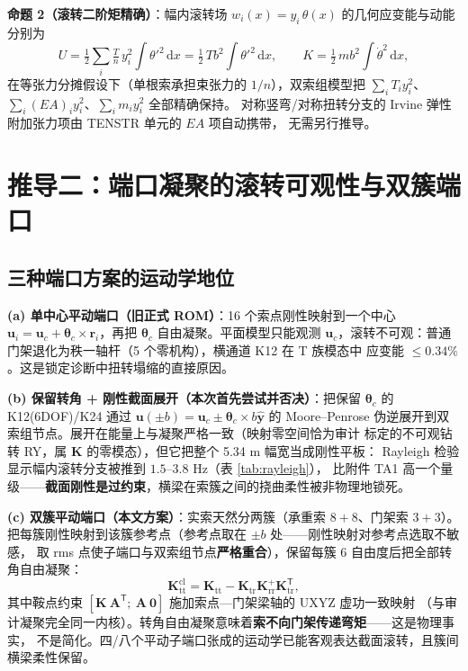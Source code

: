 \documentclass[11pt,a4paper]{ctexart}
\begin{document}
\textbf{命题 2（滚转二阶矩精确）}：幅内滚转场 $w_i(x)=y_i\,\theta(x)$ 的几何应变能与动能分别为
\begin{equation}
U=\tfrac12\textstyle\sum_i \tfrac{T}{n}\,y_i^2\!\int\!\theta'^2\,\mathrm dx
 =\tfrac12\,T b^2\!\int\!\theta'^2\,\mathrm dx,
\qquad
K=\tfrac12\, m b^2\!\int\!\dot\theta^2\,\mathrm dx ,
\end{equation}
在等张力分摊假设下（单根索承担束张力的 $1/n$），双索组模型把
$\sum_i T_i y_i^2$、$\sum_i (EA)_i y_i^2$、$\sum_i m_i y_i^2$ 全部精确保持。
对称竖弯/对称扭转分支的 Irvine 弹性附加张力项由 TENSTR 单元的 $EA$ 项自动携带，
无需另行推导。

\section{推导二：端口凝聚的滚转可观性与双簇端口}\label{sec:cluster}

\subsection{三种端口方案的运动学地位}

\textbf{(a) 单中心平动端口（旧正式 ROM）}：16 个索点刚性映射到一个中心
$\bm u_i=\bm u_c+\bm\theta_c\times\bm r_i$，再把 $\bm\theta_c$ 自由凝聚。平面模型只能观测
$\bm u_c$，滚转不可观：普通门架退化为秩一轴杆（5 个零机构），横通道 K12 在 T 族模态中
应变能 $\le0.34\%$。这是锁定诊断中扭转塌缩的直接原因。

\textbf{(b) 保留转角 + 刚性截面展开（本次首先尝试并否决）}：把保留 $\bm\theta_c$ 的
K12(6DOF)/K24 通过 $\bm u(\pm b)=\bm u_c\pm\bm\theta_c\times b\hat{\bm y}$ 的
Moore--Penrose 伪逆展开到双索组节点。展开在能量上与凝聚严格一致（映射零空间恰为审计
标定的不可观钻转 RY，属 $\bm K$ 的零模态），但它把整个 5.34 m 幅宽当成刚性平板：
Rayleigh 检验显示幅内滚转分支被推到 $1.5\text{--}3.8$ Hz（表 \ref{tab:rayleigh}），
比附件 TA1 高一个量级——\textbf{截面刚性是过约束}，横梁在索簇之间的挠曲柔性被非物理地锁死。

\textbf{(c) 双簇平动端口（本文方案）}：实索天然分两簇（承重索 $8+8$、门架索 $3+3$）。
把每簇刚性映射到该簇参考点（参考点取在 $\pm b$ 处——刚性映射对参考点选取不敏感，
取 rms 点使子端口与双索组节点\textbf{严格重合}），保留每簇 6 自由度后把全部转角自由凝聚：
\begin{equation}
\bm K_{\text{tt}}^{\text{cl}}=\bm K_{\text{tt}}-\bm K_{\text{tr}}\bm K_{\text{rr}}^{+}\bm K_{\text{tr}}^{\mathsf T},
\end{equation}
其中鞍点约束 $[\bm K\ \bm A^{\mathsf T};\ \bm A\ \bm 0]$ 施加索点—门架梁轴的 UXYZ 虚功一致映射
（与审计凝聚完全同一内核）。转角自由凝聚意味着\textbf{索不向门架传递弯矩}——这是物理事实，
不是简化。四/八个平动子端口张成的运动学已能客观表达截面滚转，且簇间横梁柔性保留。
\end{document}
